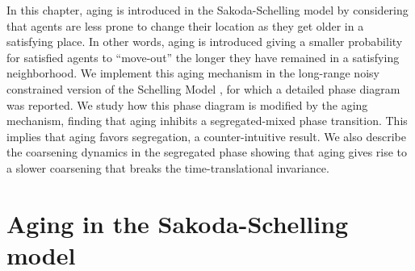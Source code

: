 In this chapter, aging is introduced in the Sakoda-Schelling model by considering that agents are less prone to change their location as they get older in a satisfying place. In other words, aging is introduced giving a smaller probability for  satisfied agents to ``move-out'' the longer they have remained in a satisfying neighborhood. We implement this aging mechanism in the long-range noisy constrained version of the Schelling Model \cite{Gauvin_2009}, for which a detailed phase diagram was reported. We study how this phase diagram is modified by the aging mechanism, finding that aging inhibits a segregated-mixed phase transition. This implies that aging favors segregation, a counter-intuitive result. We also describe the coarsening dynamics in the segregated phase showing that aging gives rise to a slower coarsening that breaks the time-translational invariance.




\section{Aging in the Sakoda-Schelling model}

